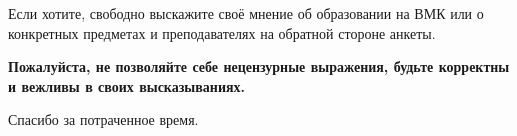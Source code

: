 Если хотите, свободно выскажите своё мнение об образовании на ВМК или о конкретных предметах и
преподавателях на обратной стороне анкеты.

\textbf{Пожалуйста, не позволяйте себе нецензурные выражения, будьте корректны и вежливы в своих \newline высказываниях.}

Спасибо за потраченное время.


